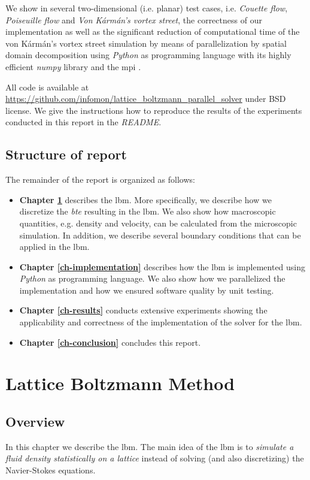 \documentclass[a4paper,11pt, footsepline]{book}
\begin{document}
We show in several two-dimensional (i.e. planar) test cases, i.e. \textit{Couette flow}, \textit{Poiseuille flow} and \textit{Von K\'{a}rm\'{a}n's vortex street}, the correctness of our implementation as well as the significant reduction of computational time of the von K\'{a}rm\'{a}n's vortex street simulation by means of parallelization by spatial domain decomposition using \textit{Python} as programming language with its highly efficient \textit{numpy} library \cite{Oliphant.2006,vanderWalt.2011} and the \acf{mpi} \cite{Dalcin.2005, Dalcin.2008, Dalcin.2011}.

All code is available at \url{https://github.com/infomon/lattice_boltzmann_parallel_solver} under BSD license. We give the instructions how to reproduce the results of the experiments conducted in this report in the \textit{README}.

\section*{Structure of report}
The remainder of the report is organized as follows:
\begin{itemize}
\item \textbf{Chapter \ref{ch-method}} describes the \ac{lbm}. More specifically, we describe how we discretize the \textit{\acf{bte}} resulting in the \ac{lbm}. We also show how macroscopic quantities, e.g. density and velocity, can be calculated from the microscopic simulation. In addition, we describe several boundary conditions that can be applied in the \ac{lbm}.
\item \textbf{Chapter \ref{ch-implementation}} describes how the \ac{lbm} is implemented using \textit{Python} as programming language. We also show how we parallelized the implementation and how we ensured software quality by unit testing.
\item \textbf{Chapter \ref{ch-results}} conducts extensive experiments showing the applicability and correctness of the implementation of the solver for the \ac{lbm}. 
\item \textbf{Chapter \ref{ch-conclusion}} concludes this report.
\end{itemize}
\chapter{Lattice Boltzmann Method}\label{ch-method}
\section{Overview}
In this chapter we describe the \acf{lbm}. The main idea of the \ac{lbm} is to \textit{simulate a fluid density statistically on a lattice} instead of solving (and also discretizing) the Navier-Stokes equations.
\end{document}
